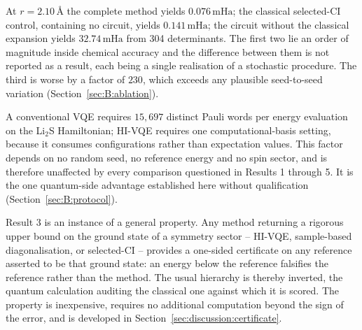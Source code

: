 \documentclass[11pt,a4paper]{article}
\newcommand{\mHa}{\ensuremath{\,\mathrm{mHa}}}
\newcommand{\Ang}{\ensuremath{\,\text{\AA}}}
\newcommand{\LiS}{\texorpdfstring{Li$_2$S}{Li2S}}
\begin{document}
\begin{result}
At $r = 2.10\Ang$ the complete method yields $0.076\mHa$; the classical
selected-CI control, containing no circuit, yields $0.141\mHa$; the circuit
without the classical expansion yields $32.74\mHa$ from 304 determinants. The
first two lie an order of magnitude inside chemical accuracy and the difference
between them is not reported as a result, each being a single realisation of a
stochastic procedure. The third is worse by a factor of $230$, which exceeds
any plausible seed-to-seed variation (Section~\ref{sec:B:ablation}).
\end{result}

\begin{result}
A conventional VQE requires $15{,}697$ distinct Pauli words per energy
evaluation on the \LiS{} Hamiltonian; HI-VQE requires one computational-basis
setting, because it consumes configurations rather than expectation values.
This factor depends on no random seed, no reference energy and no spin sector,
and is therefore unaffected by every comparison questioned in Results 1
through 5. It is the one quantum-side advantage established here without
qualification (Section~\ref{sec:B:protocol}).
\end{result}

\begin{result}
Result 3 is an instance of a general property. Any method returning a rigorous
upper bound on the ground state of a symmetry sector -- HI-VQE, sample-based
diagonalisation, or selected-CI -- provides a one-sided certificate on any
reference asserted to be that ground state: an energy below the reference
falsifies the reference rather than the method. The usual hierarchy is thereby
inverted, the quantum calculation auditing the classical one against which it
is scored. The property is inexpensive, requires no additional computation
beyond the sign of the error, and is developed in
Section~\ref{sec:discussion:certificate}.
\end{result}
\end{document}
